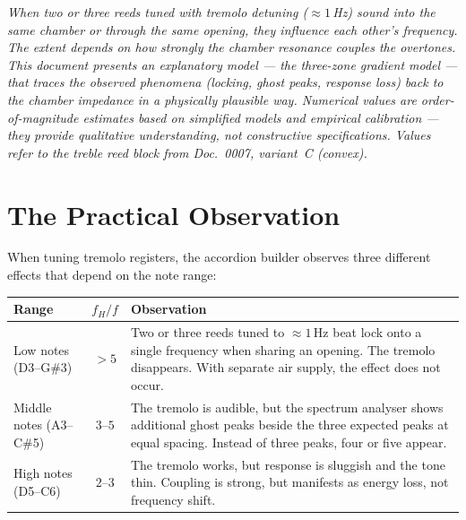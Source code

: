 \documentclass[11pt,a4paper]{article}
\begin{document}
\hbmaketitle

{\small\itshape When two or three reeds tuned with tremolo detuning ($\approx 1$\,Hz) sound into the same chamber or through the same opening, they influence each other's frequency. The extent depends on how strongly the chamber resonance couples the overtones. This document presents an explanatory model --- the three-zone gradient model --- that traces the observed phenomena (locking, ghost peaks, response loss) back to the chamber impedance in a physically plausible way. Numerical values are order-of-magnitude estimates based on simplified models and empirical calibration --- they provide qualitative understanding, not constructive specifications. Values refer to the treble reed block from Doc.~0007, variant~C (convex).}

\vspace{4mm}

\begin{table}[H]
\centering\small
{}
\end{table}

\section{The Practical Observation}

When tuning tremolo registers, the accordion builder observes three different effects that depend on the note range:

\begin{table}[H]
\centering\small
\begin{tabularx}{\textwidth}{l c X}
\hbtoprule
\textbf{Range} & $f_H/f$ & \textbf{Observation} \\
\midrule
Low notes (D3--G\#3) & $> 5$ & Two or three reeds tuned to $\approx 1$\,Hz beat lock onto a single frequency when sharing an opening. The tremolo disappears. With separate air supply, the effect does not occur. \\[4pt]
Middle notes (A3--C\#5) & $3$--$5$ & The tremolo is audible, but the spectrum analyser shows additional ghost peaks beside the three expected peaks at equal spacing. Instead of three peaks, four or five appear. \\[4pt]
High notes (D5--C6) & $2$--$3$ & The tremolo works, but response is sluggish and the tone thin. Coupling is strong, but manifests as energy loss, not frequency shift. \\
\bottomrule
\end{tabularx}
\end{table}
\end{document}
